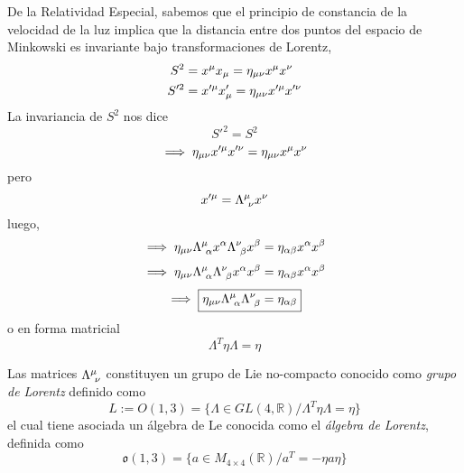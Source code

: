 De la Relatividad Especial, sabemos que el principio de constancia de la velocidad de la luz implica que la distancia entre dos puntos del espacio de Minkowski es invariante bajo transformaciones de Lorentz,
\begin{align}
  S^2&=x^\mu x_\mu =\eta_{\mu\nu }x^\mu x^\nu \\
  S'^2&=x'^\mu x'_\mu =\eta_{\mu\nu }x'^\mu x'^\nu 
\end{align}
La invariancia de $S^2$ nos dice
\begin{equation}
  S'^2=S^2
\end{equation}
\begin{equation}
  \implies \eta_{\mu\nu }x'^\mu x'^\nu =\eta_{\mu\nu }x^\mu x^\nu
\end{equation}
pero
\begin{equation}
  x'^\mu =\Lambda^\mu_{~\nu }x^\nu 
\end{equation}
luego,
\begin{equation}
  \implies \eta_{\mu\nu }\Lambda^\mu_{~\alpha}x^\alpha \Lambda^\nu _{~\beta }x^\beta =\eta_{\alpha\beta  }x^\alpha  x^\beta 
\end{equation}
\begin{equation}
  \implies \eta_{\mu\nu }\Lambda^\mu_{~\alpha} \Lambda^\nu _{~\beta }x^\alpha x^\beta =\eta_{\alpha\beta  }x^\alpha  x^\beta 
\end{equation}
\begin{equation}
  \implies\boxed{ \eta_{\mu\nu }\Lambda^\mu_{~\alpha} \Lambda^\nu _{~\beta }=\eta_{\alpha\beta  }}
\end{equation}
o en forma matricial
\begin{equation}
\boxed{  \Lambda^T\eta\Lambda=\eta}
\end{equation}

\begin{teor}
	Las matrices $\Lambda^\mu_{~\nu }$ constituyen un grupo de Lie no-compacto conocido como \textit{grupo de Lorentz} definido como
	\begin{equation}
  L:=O(1,3)=\{\Lambda\in GL(4,\mathbb{R})/\Lambda^T\eta\Lambda=\eta\}
\end{equation}
el cual tiene asociada un álgebra de Le conocida como el \textit{álgebra de Lorentz}, definida como
\begin{equation}
  \mathfrak{o}(1,3)=\{a\in M_{4\times 4}(\mathbb{R})/a^T=-\eta a\eta\}
\end{equation}
\end{teor}

